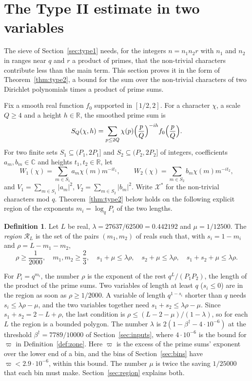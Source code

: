 \documentclass[11pt]{article}
\theoremstyle{definition}
\newtheorem{definition}[theorem]{Definition}
\begin{document}
\section{The Type II estimate in two variables}\label{sec:type2}

The sieve of Section~\ref{sec:type1} needs, for the integers $n = n_1 n_2 r$ with $n_1$ and $n_2$ in ranges near $q$
and $r$ a product of primes, that the non-trivial characters contribute less than the main term. This section proves
it in the form of Theorem~\ref{thm:type2}, a bound for the sum over the non-trivial characters of two Dirichlet
polynomials times a product of prime sums.

Fix a smooth real function $f_0$ supported in $[1/2, 2]$. For a character $\chi$, a scale $Q \ge 4$ and a
height $h \in \mathbb R$, the smoothed prime sum is
\[
  S_Q(\chi, h) = \sum_{p \le 2Q} \chi(p) \Bigl(\frac{p}{Q}\Bigr)^{-ih} f_0\Bigl(\frac{p}{Q}\Bigr).
\]
For two finite sets $S_1 \subseteq (P_1, 2P_1]$ and $S_2 \subseteq (P_2, 2P_2]$ of integers, coefficients $a_m, b_m \in
\mathbb C$ and heights $t_1, t_2 \in \mathbb R$, let
\[
  W_1(\chi) = \sum_{m \in S_1} a_m \chi(m) m^{-it_1}, \qquad W_2(\chi) = \sum_{m \in S_2} b_m \chi(m) m^{-it_2},
\]
and $V_1 = \sum_{m \in S_1} |a_m|^2$, $V_2 = \sum_{m \in S_2} |b_m|^2$. Write $\mathcal X^*$ for the non-trivial
characters mod $q$. Theorem~\ref{thm:type2} below holds on the following explicit region of the exponents
$m_i = \log_q P_i$ of the two lengths.

\begin{definition}\label{def:region}
Let $L$ be real, $\lambda = 27637/62500 = 0.442192$ and $\mu = 1/12500$. The \emph{region} $\mathcal R_L$ is the set of
the pairs $(m_1, m_2)$ of reals such that, with $s_i = 1 - m_i$ and $\rho = L - m_1 - m_2$,
\[
  \rho \ge \frac1{2000}, \quad m_1, m_2 \ge \frac23, \quad s_1 + \mu \le \lambda\rho, \quad s_2 + \mu \le \lambda\rho,
  \quad s_1 + s_2 + \mu \le \lambda\rho.
\]
\end{definition}

For $P_i = q^{m_i}$, the number $\rho$ is the exponent of the rest $q^L/(P_1 P_2)$, the length of the product of the
prime sums. Two variables of length at least $q$ ($s_i \le 0$) are in the region as soon as $\rho \ge 1/2000$. A
variable of length $q^{1 - s_i}$ shorter than $q$ needs $s_i \le \lambda\rho - \mu$, and the two variables together
need $s_1 + s_2 \le \lambda\rho - \mu$. Since $s_1 + s_2 = 2 - L + \rho$, the last condition is $\rho \le (L - 2 -
\mu)/(1 - \lambda)$, so for each $L$ the region is a bounded polygon. The number $\lambda$ is $2(1 - \beta^\dagger - 4
\cdot 10^{-6})$ at the threshold $\beta^\dagger = 7789/10000$ of Section~\ref{sec:inputs}, where $4 \cdot 10^{-6}$ is
the bound for $\varpi$ in Definition~\ref{def:zone}. Here $\varpi$ is the excess of the prime sums' exponent over the
lower end of a bin, and the bins of Section~\ref{sec:bins} have $\varpi < 2.9 \cdot 10^{-6}$, within this bound. The
number $\mu$ is twice the saving $1/25000$ that each bin must make. Section~\ref{sec:region} explains both.
\end{document}
